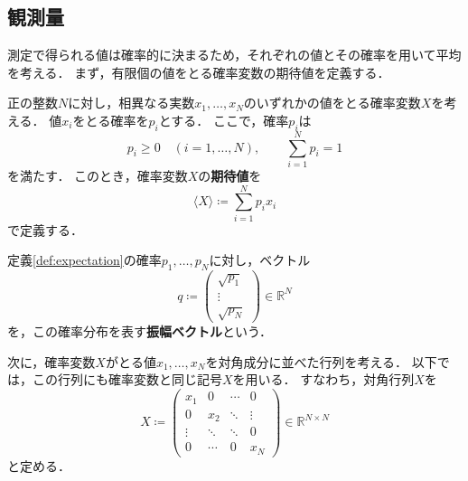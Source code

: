\subsection{観測量}
\label{subsec:observables}

測定で得られる値は確率的に決まるため，それぞれの値とその確率を用いて平均を考える．
まず，有限個の値をとる確率変数の期待値を定義する．

\begin{defi}[期待値]
\label{def:expectation}
正の整数$N$に対し，相異なる実数$x_1,\ldots,x_N$のいずれかの値をとる確率変数$X$を考える．
値$x_i$をとる確率を$p_i$とする．
ここで，確率$p_i$は
\begin{equation*}
  p_i\geq 0\quad(i=1,\ldots,N),
  \qquad
  \sum_{i=1}^{N}p_i=1
\end{equation*}
を満たす．
このとき，確率変数$X$の\textbf{期待値}を
\begin{equation}
  \langle X\rangle\coloneq\sum_{i=1}^{N}p_i x_i
  \label{eq:expectation-finite-distribution}
\end{equation}
で定義する．
\end{defi}



\begin{defi}[振幅ベクトル]
\label{def:classical-amplitude-vector}
定義\ref{def:expectation}の確率$p_1,\ldots,p_N$に対し，ベクトル
\begin{equation}
  q\coloneq
  \begin{pmatrix}
    \sqrt{p_1}\\
    \vdots\\
    \sqrt{p_N}
  \end{pmatrix}
  \in\mathbb R^N
  \label{eq:classical-amplitude-vector}
\end{equation}
を，この確率分布を表す\textbf{振幅ベクトル}という\cite[p.~93]{schuld2020}．
\end{defi}

次に，確率変数$X$がとる値$x_1,\ldots,x_N$を対角成分に並べた行列を考える．
以下では，この行列にも確率変数と同じ記号$X$を用いる．
すなわち，対角行列$X$を
\begin{equation}
  X\coloneq
  \begin{pmatrix}
    x_1 & 0 & \cdots & 0\\
    0 & x_2 & \ddots & \vdots\\
    \vdots & \ddots & \ddots & 0\\
    0 & \cdots & 0 & x_N
  \end{pmatrix}
  \in\mathbb R^{N\times N}
  \label{eq:classical-observable-diagonal-matrix}
\end{equation}
と定める\cite[p.~93]{schuld2020}．

